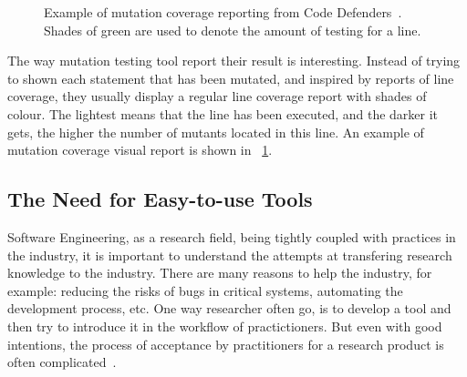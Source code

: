 \documentclass[11pt]{sdm_internship}
\theoremstyle{definition}
\begin{document}
\begin{figure}
  \centering
  \caption{Example of mutation coverage reporting from Code Defenders\protect\footnotemark{}~\cite{rojas2017code}. Shades of green are used to denote the amount of testing for a line.}%
  \label{fig:screenshot_mutation_coverage}
\end{figure}
The way mutation testing tool report their result is interesting.
Instead of trying to shown each statement that has been mutated, and inspired by reports of line coverage, they usually display a regular line coverage report with shades of colour.
The lightest means that the line has been executed, and the darker it gets, the higher the number of mutants located in this line.
An example of mutation coverage visual report is shown in \figurename~\ref{fig:screenshot_mutation_coverage}.

\subsection{The Need for Easy-to-use Tools}%
\label{ssec:need_easy}
Software Engineering, as a research field, being tightly coupled with practices in the industry, it is important to understand the attempts at transfering research knowledge to the industry.
There are many reasons to help the industry, for example: reducing the risks of bugs in critical systems, automating the development process, etc.
One way researcher often go, is to develop a tool and then try to introduce it in the workflow of practictioners.
But even with good intentions, the process of acceptance by practitioners for a research product is often complicated~\cite{delahaye2015selecting}.
\end{document}
